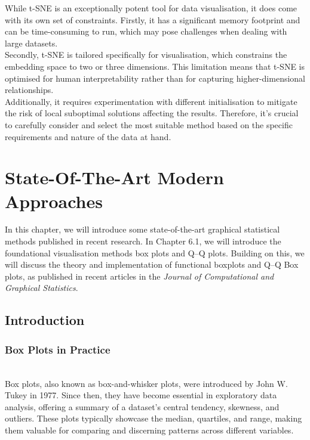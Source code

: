\documentclass{article}\usepackage[]{graphicx}\usepackage[]{xcolor}
\numberwithin{equation}{section}
\begin{document}
\noindent
While t-SNE is an exceptionally potent tool for data visualisation, it does come with its own set of constraints. Firstly, it has a significant memory footprint and can be time-consuming to run, which may pose challenges when dealing with large datasets.\\

\noindent
Secondly, t-SNE is tailored specifically for visualisation, which constrains the embedding space to two or three dimensions. This limitation means that t-SNE is optimised for human interpretability rather than for capturing higher-dimensional relationships.\\

\noindent
Additionally, it requires experimentation with different initialisation to mitigate the risk of local suboptimal solutions affecting the results. Therefore, it's crucial to carefully consider and select the most suitable method based on the specific requirements and nature of the data at hand.

\newpage 

\section{State-Of-The-Art Modern Approaches}

In this chapter, we will introduce some state-of-the-art graphical statistical methods published in recent research. In Chapter 6.1, we will introduce the foundational visualisation methods box plots and Q–Q plots. Building on this, we will discuss the theory and implementation of functional boxplots and Q–Q Box plots, as published in recent articles in the \textit{Journal of Computational and Graphical Statistics}. 

\subsection{Introduction}

\subsubsection{Box Plots in Practice}\\

\noindent 
Box plots, also known as box-and-whisker plots, were introduced by John W. Tukey in 1977. Since then, they have become essential in exploratory data analysis, offering a summary of a dataset's central tendency, skewness, and outliers. These plots typically showcase the median, quartiles, and range, making them valuable for comparing and discerning patterns across different variables.\\
\end{document}
